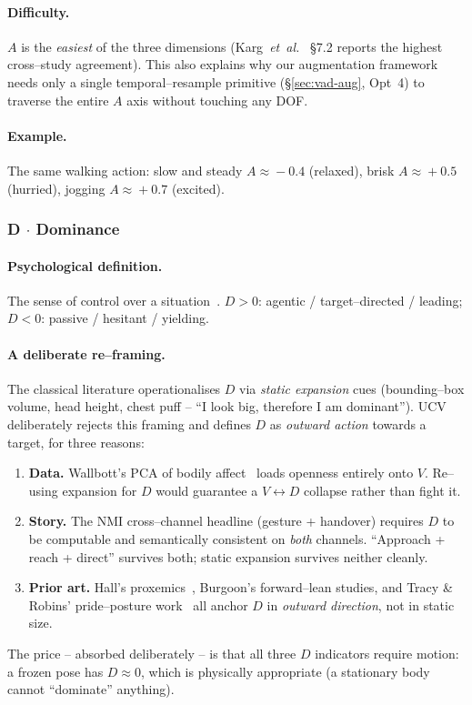 \paragraph{Difficulty.}
$A$ is the \emph{easiest} of the three dimensions
(Karg~\textit{et~al.}~\cite{karg2013body} \S7.2 reports the highest
cross--study agreement). This also explains why our augmentation
framework needs only a single temporal--resample primitive
(\S\ref{sec:vad-aug}, Opt~4) to traverse the entire $A$ axis without
touching any DOF.

\paragraph{Example.}
The same walking action: slow and steady $A\!\approx\!-0.4$ (relaxed),
brisk $A\!\approx\!+0.5$ (hurried), jogging $A\!\approx\!+0.7$
(excited).

\subsubsection*{D $\cdot$ Dominance}

\paragraph{Psychological definition.}
The sense of control over a situation~\cite{mehrabian1996pad}. $D>0$:
agentic / target--directed / leading; $D<0$: passive / hesitant /
yielding.

\paragraph{A deliberate re--framing.}
The classical literature operationalises $D$ via \emph{static expansion}
cues (bounding--box volume, head height, chest puff -- ``I look big,
therefore I am dominant''). UCV deliberately rejects this framing
and defines $D$ as \emph{outward action} towards a target, for three
reasons:
\begin{enumerate}\itemsep1pt
  \item \textbf{Data.} Wallbott's PCA of bodily affect~\cite{wallbott1998bodily}
        loads openness entirely onto $V$. Re--using expansion for $D$ would
        guarantee a $V\!\leftrightarrow\!D$ collapse rather than fight it.
  \item \textbf{Story.} The NMI cross--channel headline (gesture +
        handover) requires $D$ to be computable and semantically
        consistent on \emph{both} channels. ``Approach + reach + direct''
        survives both; static expansion survives neither cleanly.
  \item \textbf{Prior art.} Hall's proxemics~\cite{hall1966hidden},
        Burgoon's forward--lean studies, and Tracy \&
        Robins' pride--posture work~\cite{tracy2004show} all anchor $D$
        in \emph{outward direction}, not in static size.
\end{enumerate}
The price -- absorbed deliberately -- is that all three $D$ indicators
require motion: a frozen pose has $D\!\approx\!0$, which is physically
appropriate (a stationary body cannot ``dominate'' anything).


